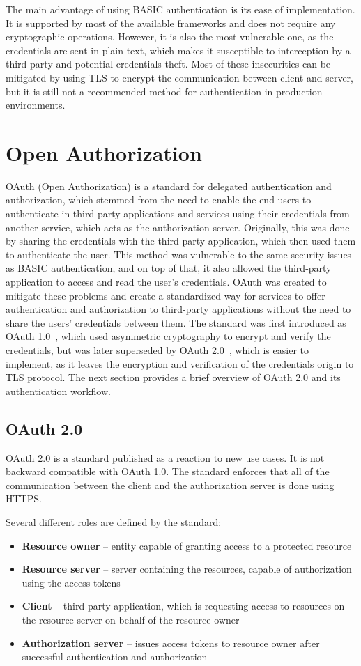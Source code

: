 The main advantage of using BASIC authentication is its ease of implementation. It is supported by most of the available frameworks and does not require any cryptographic operations. However, it is also the most vulnerable one, as the credentials are sent in plain text, which makes it susceptible to interception by a third-party and potential credentials theft. Most of these insecurities can be mitigated by using TLS to encrypt the communication between client and server, but it is still not a recommended method for authentication in production environments.

\section{Open Authorization}
OAuth (Open Authorization) is a standard for delegated authentication and authorization, which stemmed from the need to enable the end users to authenticate in third-party applications and services using their credentials from another service, which acts as the authorization server. Originally, this was done by sharing the credentials with the third-party application, which then used them to authenticate the user. This method was vulnerable to the same security issues as BASIC authentication, and on top of that, it also allowed the third-party application to access and read the user's credentials. OAuth was created to mitigate these problems and create a standardized way for services to offer authentication and authorization to third-party applications without the need to share the users' credentials between them. The standard was first introduced as OAuth 1.0 \cite{oauth1_rfc}, which used asymmetric cryptography to encrypt and verify the credentials, but was later superseded by OAuth 2.0 \cite{oauth2_rfc}, which is easier to implement, as it leaves the encryption and verification of the credentials origin to TLS protocol. The next section provides a brief overview of OAuth 2.0 and its authentication workflow.

\subsection{OAuth 2.0}
OAuth 2.0 is a standard published as a reaction to new use cases. It is not backward compatible with OAuth 1.0. The standard enforces that all of the communication between the client and the authorization server is done using HTTPS.

Several different roles are defined by the standard:
\begin{itemize}
  \item \textbf{Resource owner} -- entity capable of granting access to a protected resource
  \item \textbf{Resource server} -- server containing the resources, capable of authorization using the access tokens
  \item \textbf{Client} -- third party application, which is requesting access to resources on the resource server on behalf of the resource owner
  \item \textbf{Authorization server} -- issues access tokens to resource owner after successful authentication and authorization
\end{itemize}

